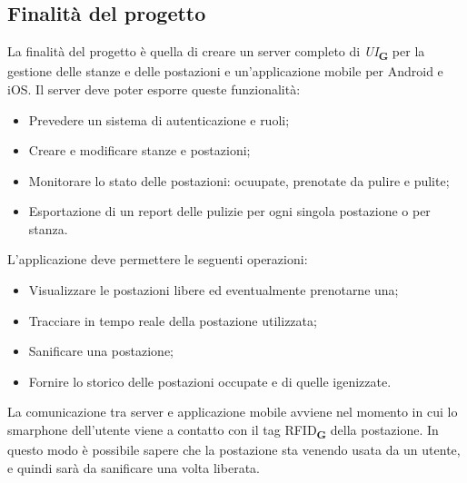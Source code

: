 \subsection{Finalità del progetto}
La finalità del progetto è quella di creare un server completo di \textit{UI}\textsubscript{\textbf{G}} per la gestione delle stanze e delle postazioni e un'applicazione mobile per Android e iOS.
Il server deve poter esporre queste funzionalità:
\begin{itemize}
    \item Prevedere un sistema di autenticazione e ruoli;
    \item Creare e modificare stanze e postazioni;
    \item Monitorare lo stato delle postazioni: ocuupate, prenotate da pulire e pulite;
    \item Esportazione di un report delle pulizie per ogni singola postazione o per stanza.
\end{itemize}
L'applicazione deve permettere le seguenti operazioni:
\begin{itemize}
    \item Visualizzare le postazioni libere ed eventualmente prenotarne una;
    \item Tracciare in tempo reale della postazione utilizzata;
    \item Sanificare una postazione;
    \item Fornire lo storico delle postazioni occupate e di quelle igenizzate.
\end{itemize}
La comunicazione tra server e applicazione mobile avviene nel momento in cui lo smarphone dell'utente viene a contatto con il tag RFID\textsubscript{\textbf{G}} della postazione.
In questo modo è possibile sapere che la postazione sta venendo usata da un utente, e quindi sarà da sanificare una volta liberata.

